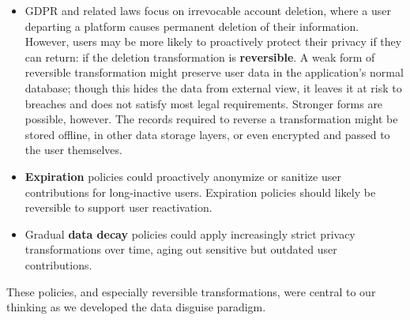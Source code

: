 \begin{itemize}
\item GDPR and related laws focus on irrevocable account deletion, where
a user departing a platform causes permanent deletion of their information.
However, users may be more likely to proactively protect their privacy if they
can return: if the deletion transformation is \textbf{reversible}.
%
A weak form of reversible transformation might preserve user data in the
application's normal database; though this hides the data from external view,
it leaves it at risk to breaches and does not satisfy most legal requirements.
Stronger forms are possible, however. The records required to reverse a
transformation might be stored offline, in other data storage layers, or even
encrypted and passed to the user themselves.


\item \textbf{Expiration} policies could proactively anonymize or sanitize
user contributions for long-inactive users. Expiration policies should likely
be reversible to support user reactivation.

\item Gradual \textbf{data decay} policies could apply increasingly strict privacy transformations
    over time, aging out sensitive but outdated user contributions.
\end{itemize}
%
These policies, and especially reversible transformations, were central to our
thinking as we developed the data disguise paradigm.



